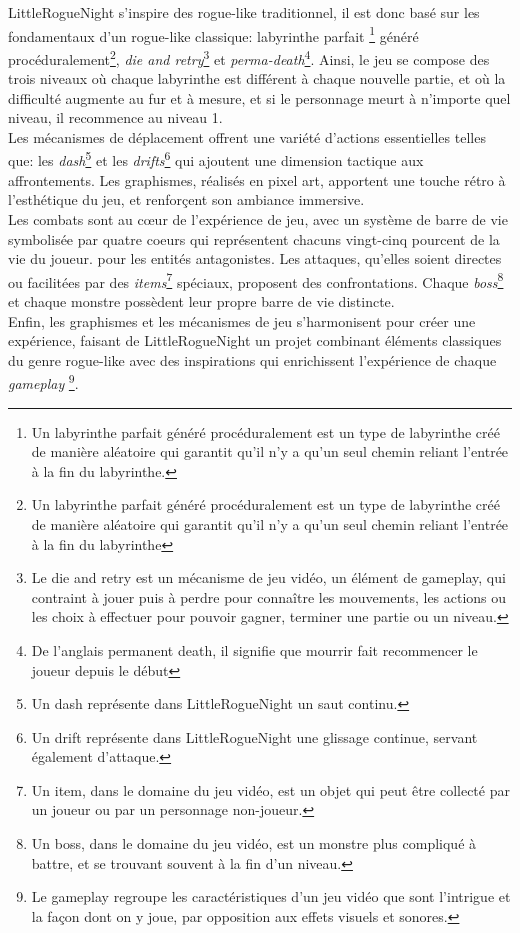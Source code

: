 \documentclass[10pt]{article}
\begin{document}
LittleRogueNight s'inspire des rogue-like traditionnel, il est donc basé sur les fondamentaux d'un rogue-like classique: labyrinthe parfait
\footnote{Un labyrinthe parfait généré procéduralement est un type de labyrinthe créé de manière aléatoire qui garantit qu'il n'y a qu'un 
seul chemin reliant l'entrée à la fin du labyrinthe.} généré procéduralement\footnote{Un labyrinthe parfait généré procéduralement est un type de labyrinthe 
créé de manière aléatoire qui garantit qu'il n'y a qu'un seul chemin reliant l'entrée à la fin du labyrinthe}, \textit{die and retry}\footnote{Le die and retry est un mécanisme de jeu vidéo, un élément de gameplay, 
qui contraint à jouer puis à perdre pour connaître les mouvements, les actions ou les choix à effectuer pour pouvoir gagner, terminer une partie ou 
un niveau.} et \textit{perma-death}\footnote{De l'anglais permanent death, il signifie que mourrir fait recommencer le joueur depuis le début}. 
Ainsi, le jeu se compose des trois niveaux où chaque labyrinthe est différent à chaque nouvelle partie, 
et où la difficulté augmente au fur et à mesure, et si le personnage meurt à n'importe quel niveau, il recommence au niveau 1.\\

Les mécanismes de déplacement offrent une variété d'actions essentielles telles que: les \textit{dash}\footnote{Un dash représente dans LittleRogueNight un saut continu.} et 
les \textit{drifts}\footnote{Un drift représente dans LittleRogueNight une glissage continue, servant également d'attaque.} qui
ajoutent une dimension tactique aux affrontements. Les graphismes, réalisés en pixel art, apportent une touche rétro à l'esthétique du jeu, 
et renforçent son ambiance immersive.\\

Les combats sont au cœur de l'expérience de jeu, avec un système de barre de vie symbolisée par quatre coeurs qui représentent chacuns vingt-cinq pourcent 
de la vie du joueur. pour les entités antagonistes. Les attaques, 
qu'elles soient directes ou facilitées par des \textit{items}\footnote{Un item, dans le domaine du jeu vidéo, est un objet qui peut être 
collecté par un joueur ou par un personnage non-joueur.} 
spéciaux, proposent des confrontations. Chaque \textit{boss}\footnote{Un boss, dans le domaine du jeu vidéo, est un monstre plus compliqué à battre, 
et se trouvant souvent à la fin d'un niveau.} et chaque monstre 
possèdent leur propre barre de vie distincte.\\

Enfin, les graphismes et les mécanismes de jeu s'harmonisent pour créer une expérience, faisant de LittleRogueNight un projet 
combinant éléments classiques du genre rogue-like avec des inspirations qui enrichissent l'expérience de chaque \textit{gameplay}
\footnote{Le gameplay regroupe les caractéristiques d'un jeu vidéo que sont l'intrigue et la façon dont on y joue, par opposition aux effets visuels et sonores. }.\\
\end{document}
